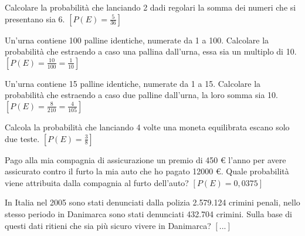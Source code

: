 \begin{esercizio}[\Ast]
 \label{ese:9.13}
Calcolare la probabilità che lanciando 2 dadi regolari la somma dei numeri che 
si presentano sia 6.
\hfill \(\left[P(E)=\frac 5{36}\right]\)
\end{esercizio}

\begin{esercizio}[\Ast]
 \label{ese:9.14}
Un'urna contiene 100 palline identiche, numerate da 1 a 100. Calcolare la 
probabilità che estraendo a caso una pallina dall'urna, essa sia un multiplo di 
10.
\hfill \(\left[P(E)=\frac{10}{100}=\frac 1{10}\right]\)
\end{esercizio}

\begin{esercizio}[\Ast]
 \label{ese:9.15}
Un'urna contiene 15 palline identiche, numerate da 1 a 15. Calcolare la 
probabilità che estraendo a caso due palline dall'urna, la loro somma sia 10.
\hfill \(\left[P(E)=\frac 8{210}=\frac 4{105}\right]\)
\end{esercizio}

\begin{esercizio}[\Ast]
 \label{ese:9.16}
Calcola la probabilità che lanciando 4 volte una moneta equilibrata escano solo 
due teste.
\hfill \(\left[P(E)=\frac 3 8\right]\)
\end{esercizio}

\begin{esercizio}[\Ast]
 \label{ese:9.17}
Pago alla mia compagnia di assicurazione un premio di 450 € l'anno per avere 
assicurato contro il furto la mia auto che ho pagato 12000 €. Quale probabilità 
viene attribuita dalla compagnia al furto dell'auto?
\hfill \(\left[P(E)=0,0375\right]\)
\end{esercizio}
% 

\begin{esercizio}
 \label{ese:9.19}
In Italia nel 2005 sono stati denunciati dalla polizia 2.579.124 crimini penali, 
nello stesso periodo in Danimarca sono stati denunciati 432.704 crimini. Sulla 
base di questi dati ritieni che sia più sicuro vivere in Danimarca?
\hfill \(\left[...\right]\)
\end{esercizio}

